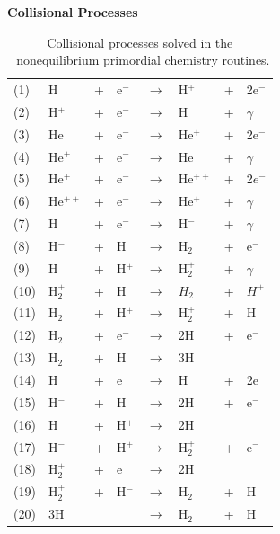 \begin{table}
\begin{center}
{\bfseries Collisional Processes}\\[1ex]
\begin{tabular}{llllllll}
(1) & H & + & e$^-$ & $\rightarrow$ & H$^+$ &+& 2e$^-$ \\
(2) & H$^+$ &+ &e$^-$ & $\rightarrow$ & H &+ &$\gamma$ \\
(3) & He &+& e$^-$ & $\rightarrow$ & He$^+$ &+& 2e$^-$  \\
(4) & He$^+$ &+& e$^-$ & $\rightarrow$ & He &+ &$\gamma$  \\
(5) & He$^{+}$ &+& e$^-$ & $\rightarrow$ & He$^{++}$ &+& 2$e^-$  \\
(6) & He$^{++}$ &+& e$^-$ & $\rightarrow$ & He$^+$ &+& $\gamma$ \\
(7) & H &+& e$^-$ &$\rightarrow$& H$^-$ &+& $\gamma$  \\
(8) & H$^-$ &+& H &$\rightarrow$ & H$_2$ & +& e$^-$ \\
(9) & H &+ &H$^+$ &$\rightarrow$ &H$_2^+$ &+ &$\gamma$ \\
(10) & H$_2^+$ &+ &H &$\rightarrow$ &$H_2$ &+ &$H^+$ \\
(11) & H$_2$ &+ &H$^+$ &$\rightarrow$ &H$_2^+$ & +& H \\
(12) & H$_2$ &+ &e$^-$ & $\rightarrow$ & 2H & + & e$^-$  \\
(13) & H$_2$ & + & H & $\rightarrow$ & 3H &   &      \\
(14) & H$^-$ & + & e$^-$ & $\rightarrow$ & H & + & 2e$^-$ \\
(15) & H$^-$ & + & H & $\rightarrow$ & 2H & + & e$^-$ \\ 
(16) & H$^-$ & + & H$^+$ & $\rightarrow$ & 2H & & \\
(17) & H$^-$ & + & H$^+$ & $\rightarrow$ & H$_2^+$ & + & e$^-$ \\
(18) & H$_2^+$ & + & e$^-$ & $\rightarrow$ & 2H & & \\
(19) & H$_2^+$ & + & H$^-$ & $\rightarrow$ & H$_2$ & + & H  \\
(20) & 3H & & & $\rightarrow$ & H$_2$ & + & H
\end{tabular}
\caption[]{Collisional processes solved in the \enzo\ nonequilibrium
primordial chemistry routines.}
\label{table.collisional}
\end{center}
\end{table}



